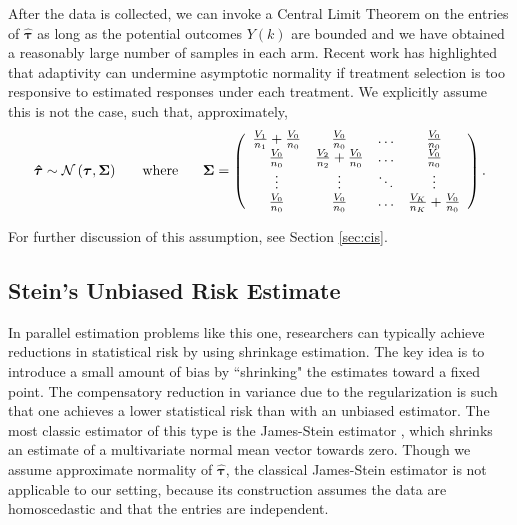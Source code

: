 \documentclass{article}
\newcommand{\bstau}{\boldsymbol \tau}
\newcommand{\hbstau}{\boldsymbol{\hat \tau}}
\begin{document}
After the data is collected, we can invoke a Central Limit Theorem on the entries of $\hbstau$ as long as the potential outcomes $Y(k)$ are bounded and we have obtained a reasonably large number of samples in each arm. Recent work \citep[see e.g.][]{hadad2021confidence} has highlighted that adaptivity can undermine asymptotic normality if treatment selection is too responsive to estimated responses under each treatment. We explicitly assume this is not the case, such that, approximately, 
\begin{equation}\label{eq:samplingModel}
\hbstau \sim \mathcal{N} \left( \bstau,  \boldsymbol \Sigma \right) \hspace{5mm} \text{ where } \hspace{5mm} \boldsymbol \Sigma = \left( \begin{array}{cccc} 
\frac{V_1}{n_1} + \frac{V_0}{n_0} & \frac{V_0}{n_0} & \hdots & \frac{V_0}{n_0} \\
\frac{V_0}{n_0} & \frac{V_2}{n_2} + \frac{V_0}{n_0} & \hdots & \frac{V_0}{n_0}
 \\ \vdots & \vdots & \ddots & \vdots \\
 \frac{V_0}{n_0} & \frac{V_0}{n_0} & \hdots & \frac{V_K}{n_K} + \frac{V_0}{n_0} \end{array} \right) . 
\end{equation}

\noindent For further discussion of this assumption, see Section \ref{sec:cis}.

\subsection{Stein's Unbiased Risk Estimate}

In parallel estimation problems like this one, researchers can typically achieve reductions in statistical risk by using %
shrinkage estimation. 
The key idea is to introduce a small amount of bias by ``shrinking" the estimates toward a fixed point. %
The compensatory reduction in variance due to the regularization is such that one achieves a lower statistical risk than with an unbiased estimator. The most classic estimator of this type is the James-Stein estimator \citep{stein1956inadmissibility}, which shrinks an estimate of a multivariate normal mean vector towards zero. Though we assume approximate normality of $\hbstau$, the classical James-Stein estimator is not applicable to our setting, because its construction assumes the data are homoscedastic and that the entries are independent. 
\end{document}
